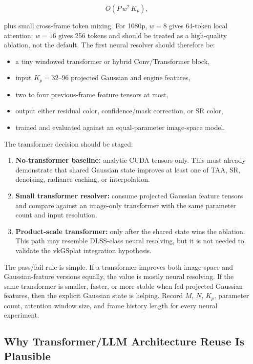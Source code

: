 \documentclass[11pt]{article}
\begin{document}
\[
  O(P\,w^2\,K_p),
\]

plus small cross-frame token mixing. For 1080p, $w=8$ gives 64-token local
attention; $w=16$ gives 256 tokens and should be treated as a high-quality
ablation, not the default. The first neural resolver should therefore be:

\begin{itemize}
  \item a tiny windowed transformer or hybrid Conv/Transformer block,
  \item input $K_p=32$--$96$ projected Gaussian and engine features,
  \item two to four previous-frame feature tensors at most,
  \item output either residual color, confidence/mask correction, or SR color,
  \item trained and evaluated against an equal-parameter image-space model.
\end{itemize}

The transformer decision should be staged:

\begin{enumerate}
  \item \textbf{No-transformer baseline:} analytic CUDA tensors only. This must
        already demonstrate that shared Gaussian state improves at least one of
        TAA, SR, denoising, radiance caching, or interpolation.
  \item \textbf{Small transformer resolver:} consume projected Gaussian feature
        tensors and compare against an image-only transformer with the same
        parameter count and input resolution.
  \item \textbf{Product-scale transformer:} only after the shared state wins the
        ablation. This path may resemble DLSS-class neural resolving, but it is
        not needed to validate the vkGSplat integration hypothesis.
\end{enumerate}

The pass/fail rule is simple. If a transformer improves both image-space and
Gaussian-feature versions equally, the value is mostly neural resolving. If the
same transformer is smaller, faster, or more stable when fed projected Gaussian
features, then the explicit Gaussian state is helping. Record $M$, $N$, $K_p$,
parameter count, attention window size, and frame history length for every
neural experiment.

\subsection{Why Transformer/LLM Architecture Reuse Is Plausible}
\end{document}
